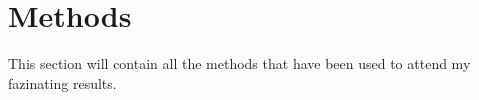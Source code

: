 \section{Methods}

This section will contain all the methods that have been used to attend my
fazinating results.

